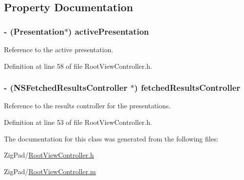 \subsection{Property Documentation}
\hypertarget{interface_root_view_controller_ae180d02b7737a300a02c7e8de4426e1d}{
\subsubsection[{activePresentation}]{\setlength{\rightskip}{0pt plus 5cm}-\/ ({\bf Presentation}$\ast$) activePresentation}}
\label{interface_root_view_controller_ae180d02b7737a300a02c7e8de4426e1d}
Reference to the active presentation. 

Definition at line 58 of file RootViewController.h.

\hypertarget{interface_root_view_controller_a7188ae93e075694ba7b03c301e09f8a2}{
\subsubsection[{fetchedResultsController}]{\setlength{\rightskip}{0pt plus 5cm}-\/ (NSFetchedResultsController $\ast$) fetchedResultsController}}
\label{interface_root_view_controller_a7188ae93e075694ba7b03c301e09f8a2}
Reference to the results controller for the presentations. 

Definition at line 53 of file RootViewController.h.



The documentation for this class was generated from the following files:\begin{DoxyCompactItemize}
\item 
ZigPad/\hyperlink{_root_view_controller_8h}{RootViewController.h}\item 
ZigPad/\hyperlink{_root_view_controller_8m}{RootViewController.m}\end{DoxyCompactItemize}
